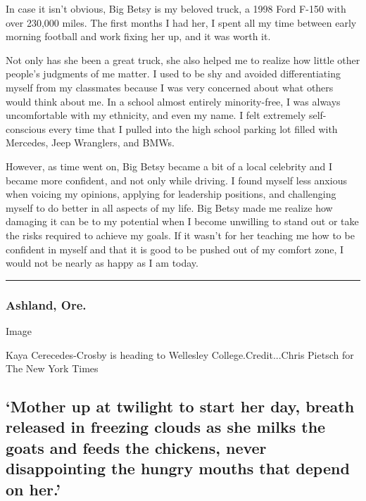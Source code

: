 In case it isn't obvious, Big Betsy is my beloved truck, a 1998 Ford
F-150 with over 230,000 miles. The first months I had her, I spent all
my time between early morning football and work fixing her up, and it
was worth it.

Not only has she been a great truck, she also helped me to realize how
little other people's judgments of me matter. I used to be shy and
avoided differentiating myself from my classmates because I was very
concerned about what others would think about me. In a school almost
entirely minority-free, I was always uncomfortable with my ethnicity,
and even my name. I felt extremely self-conscious every time that I
pulled into the high school parking lot filled with Mercedes, Jeep
Wranglers, and BMWs.

However, as time went on, Big Betsy became a bit of a local celebrity
and I became more confident, and not only while driving. I found myself
less anxious when voicing my opinions, applying for leadership
positions, and challenging myself to do better in all aspects of my
life. Big Betsy made me realize how damaging it can be to my potential
when I become unwilling to stand out or take the risks required to
achieve my goals. If it wasn't for her teaching me how to be confident
in myself and that it is good to be pushed out of my comfort zone, I
would not be nearly as happy as I am today.

\begin{center}\rule{0.5\linewidth}{\linethickness}\end{center}

\hypertarget{ashland-ore}{%
\subsubsection{Ashland, Ore.}\label{ashland-ore}}

Image

Kaya Cerecedes-Crosby is heading to Wellesley College.Credit...Chris
Pietsch for The New York Times

\hypertarget{mother-up-at-twilight-to-start-her-day-breath-released-in-freezing-clouds-as-she-milks-the-goats-and-feeds-the-chickens-never-disappointing-the-hungry-mouths-that-depend-on-her}{%
\subsection{`Mother up at twilight to start her day, breath released in
freezing clouds as she milks the goats and feeds the chickens, never
disappointing the hungry mouths that depend on
her.'}\label{mother-up-at-twilight-to-start-her-day-breath-released-in-freezing-clouds-as-she-milks-the-goats-and-feeds-the-chickens-never-disappointing-the-hungry-mouths-that-depend-on-her}}

